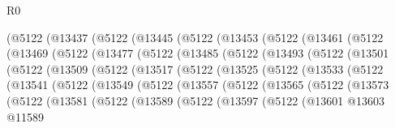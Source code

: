 \begin{lexlean}{R0}
\begin{coremodule}
      (@5122
        (@13437
          (@5122
            (@13445
              (@5122
                (@13453
                  (@5122
                    (@13461
                      (@5122
                        (@13469
                          (@5122
                            (@13477
                              (@5122
                                (@13485
                                  (@5122
                                    (@13493
                                      (@5122
                                        (@13501
                                          (@5122
                                            (@13509
                                              (@5122
                                                (@13517
                                                  (@5122
                                                    (@13525
                                                      (@5122
                                                        (@13533
                                                          (@5122
                                                            (@13541
                                                              (@5122
                                                                (@13549
                                                                  (@5122
                                                                    (@13557
                                                                      (@5122
                                                                        (@13565
                                                                          (@5122
                                                                            (@13573
                                                                              (@5122
                                                                                (@13581
                                                                                  (@5122
                                                                                    (@13589
                                                                                      (@5122
                                                                                        (@13597
                                                                                          (@5122
                                                                                            (@13601
                                                                                              @13603
                                                                                              @11589

\end{coremodule}
\end{lexlean}
